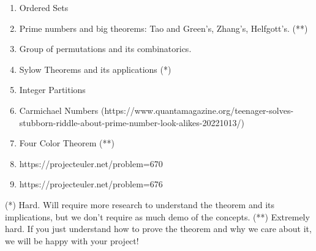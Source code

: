 \documentclass{article}
\begin{document}
\begin{enumerate}[label = \arabic*.]
    \item Ordered Sets
        
    \item Prime numbers and big theorems: Tao and Green's, Zhang's, Helfgott's. (**)
    \item Group of permutations and its combinatorics.
        
    \item Sylow Theorems and its applications (*)
        
    \item Integer Partitions
        
    \item Carmichael Numbers (https://www.quantamagazine.org/teenager-solves-stubborn-riddle-about-prime-number-look-alikes-20221013/)
        
    \item Four Color Theorem (**)
        
    \item https://projecteuler.net/problem=670
    \item https://projecteuler.net/problem=676
\end{enumerate}

(*) Hard. Will require more research to understand the theorem and its implications, but we don't require as much demo of the concepts.
(**) Extremely hard. If you just understand how to prove the theorem and why we care about it, we will be happy with your project!
\end{document}
